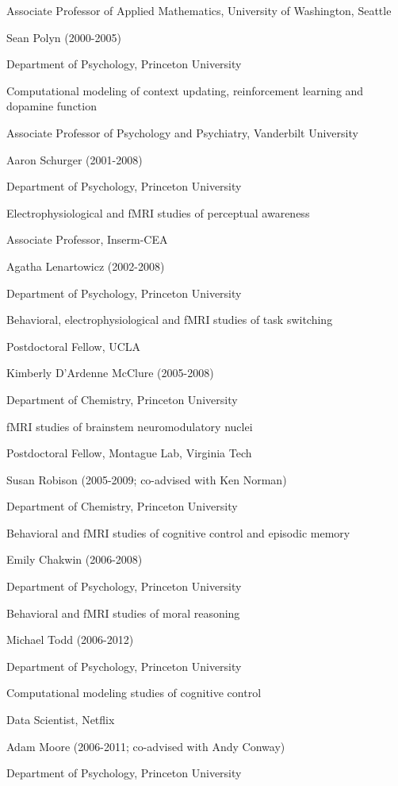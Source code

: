 \documentclass[10 pt]{article}
\begin{document}
Associate Professor of Applied Mathematics, University of Washington, Seattle
    \medskip

Sean Polyn (2000-2005)

Department of Psychology, Princeton University

Computational modeling of context updating, reinforcement learning and dopamine function

Associate Professor of Psychology and Psychiatry, Vanderbilt University
    \medskip

Aaron Schurger (2001-2008)

Department of Psychology, Princeton University

Electrophysiological and fMRI studies of perceptual awareness

Associate Professor, Inserm-CEA
    \medskip

Agatha Lenartowicz (2002-2008)

Department of Psychology, Princeton University

Behavioral, electrophysiological and fMRI studies of task switching

Postdoctoral Fellow, UCLA
    \medskip

Kimberly D’Ardenne McClure (2005-2008)

Department of Chemistry, Princeton University

fMRI studies of brainstem neuromodulatory nuclei

Postdoctoral Fellow, Montague Lab, Virginia Tech
    \medskip

Susan Robison (2005-2009; co-advised with Ken Norman)

Department of Chemistry, Princeton University

Behavioral and fMRI studies of cognitive control and episodic memory
    \medskip

Emily Chakwin (2006-2008)

Department of Psychology, Princeton University

Behavioral and fMRI studies of moral reasoning
    \medskip

Michael Todd (2006-2012)

Department of Psychology, Princeton University

Computational modeling studies of cognitive control

Data Scientist, Netflix
    \medskip

Adam Moore (2006-2011; co-advised with Andy Conway)

Department of Psychology, Princeton University
\end{document}
